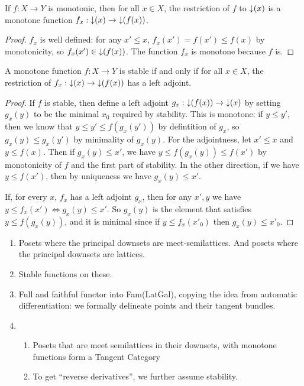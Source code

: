 \begin{lemma}
  If $f : X \to Y$ is monotonic, then for all $x \in X$, the
  restriction of $f$ to $\mathop{\downarrow}(x)$ is a monotone function
  $f_x : \mathop{\downarrow}(x) \to \mathop{\downarrow}(f(x))$.
\end{lemma}

\begin{proof}
  $f_x$ is well defined: for any $x' \leq x$,
  $f_x(x') = f(x') \leq f(x)$ by monotonicity, so
  $f_x(x') \in \mathop{\downarrow}(f(x))$. The function $f_x$ is monotone because
  $f$ is.
\end{proof}

\begin{lemma}
  A monotone function $f : X \to Y$ is stable if and only if for all
  $x \in X$, the restriction of $f_x : \mathop{\downarrow}(x) \to \mathop{\downarrow}(f(x))$
  has a left adjoint.
\end{lemma}

\begin{proof}
  If $f$ is stable, then define a left adjoint
  $g_x : \mathop{\downarrow}(f(x)) \to \mathop{\downarrow}(x)$ by setting $g_x(y)$ to be the
  minimal $x_0$ required by stability. This is monotone: if
  $y \leq y'$, then we know that $y \leq y' \leq f(g_x(y'))$ by
  defintition of $g_x$, so $g_x(y) \leq g_x(y')$ by minimality of
  $g_x(y)$. For the adjointness, let $x' \leq x$ and $y \leq
  f(x)$. Then if $g_x(y) \leq x'$, we have
  $y \leq f(g_x(y)) \leq f(x')$ by monotonicity of $f$ and the first
  part of stability. In the other direction, if we have
  $y \leq f(x')$, then by uniqueness we have $g_x(y) \leq x'$.

  If, for every $x$, $f_x$ has a left adjoint $g_x$, then for any
  $x', y$ we have $y \leq f_x(x') \Leftrightarrow g_x(y) \leq x'$. So
  $g_x(y)$ is the element that satisfies $y \leq f(g_x(y))$, and it is
  minimal since if $y \leq f_x(x'_0)$ then $g_x(y) \leq x'_0$.
\end{proof}

\begin{enumerate}
\item Posets where the principal downsets are meet-semilattices. And
  posets where the principal downsets are lattices.
\item Stable functions on these.
\item Full and faithful functor into Fam(LatGal), copying the idea
  from automatic differentiation: we formally delineate points and
  their tangent bundles.
\item
  \begin{enumerate}
  \item Posets that are meet semilattices in their downsets, with
    monotone functions form a Tangent Category
  \item To get ``reverse derivatives'', we further assume stability.
  \end{enumerate}
\end{enumerate}
